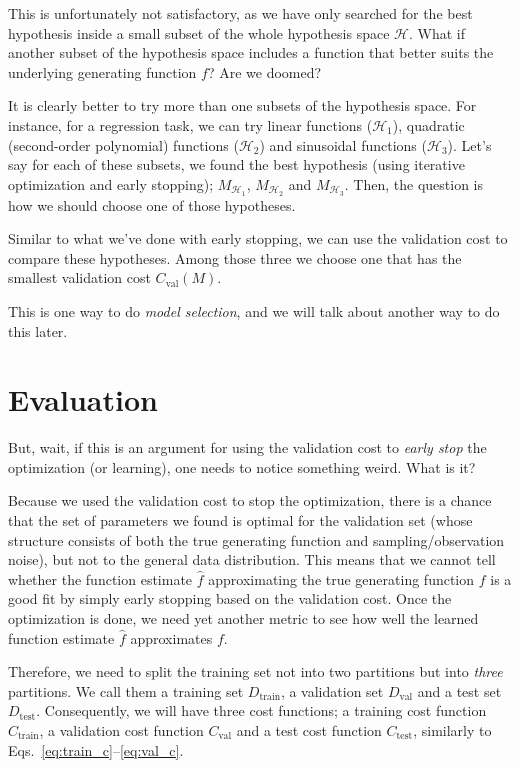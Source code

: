 \documentclass{report}
\newcommand{\HH}[0]{\mathcal{H}}
\newcommand{\train}{\text{train}}
\newcommand{\val}{\text{val}}
\newcommand{\test}{\text{test}}
\begin{document}
This is unfortunately not satisfactory, as we have only searched for the best
hypothesis inside a small subset of the whole hypothesis space $\HH$. What if
another subset of the hypothesis space includes a function that better suits the
underlying generating function $f$? Are we doomed?

It is clearly better to try more than one subsets of the hypothesis space. For
instance, for a regression task, we can try linear functions ($\HH_1$),
quadratic (second-order polynomial) functions ($\HH_2$) and sinusoidal functions
($\HH_3$). Let's say for each of these subsets, we found the best hypothesis
(using iterative optimization and early stopping); $M_{\HH_1}$, $M_{\HH_2}$ and
$M_{\HH_3}$. Then, the question is how we should choose one of those hypotheses.

Similar to what we've done with early stopping, we can use the validation cost
to compare these hypotheses. Among those three we choose one that has the
smallest validation cost $C_{\val}(M)$.

This is one way to do {\em model selection}, and we will talk about another way
to do this later.

\section{Evaluation}

But, wait, if this is an argument for using the validation cost to {\em early
stop} the optimization (or learning), one needs to notice something weird. What
is it?

Because we used the validation cost to stop the optimization, there is a chance
that the set of parameters we found is optimal for the validation set (whose
structure consists of both the true generating function and sampling/observation
noise), but not to the general data distribution. This means that we cannot tell
whether the function estimate $\hat{f}$ approximating the true generating
function $f$ is a good fit by simply early stopping based on the validation
cost.  Once the optimization is done, we need yet another metric to see how well
the learned function estimate $\hat{f}$ approximates $f$.

Therefore, we need to split the training set not into two partitions but into
{\em three} partitions. We call them a training set $D_{\train}$, a validation
set $D_{\val}$ and a test set $D_{\test}$. Consequently, we will have three cost
functions; a training cost function $C_{\train}$, a validation cost function
$C_{\val}$ and a test cost function $C_{\test}$, similarly to
Eqs.~\ref{eq:train_c}--\ref{eq:val_c}.
\end{document}
